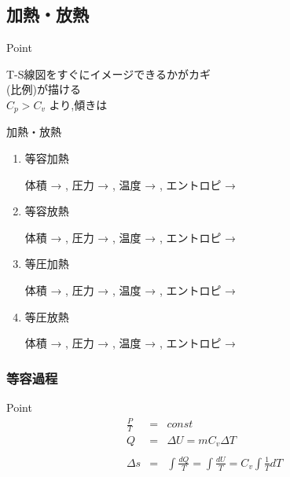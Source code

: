 \documentclass[a4paper]{jsarticle}
\begin{document}
\subsection{加熱・放熱}
\begin{itembox}[l]{Point}
    \begin{center}
        T-S線図をすぐにイメージできるかがカギ\\
        (比例)が描ける\\
        $C_p > C_v$ より,傾きは \\
    \end{center}
\end{itembox}
\begin{itembox}[l]{加熱・放熱}
    \begin{enumerate}[(1)]
        \item 等容加熱
              \begin{center}
                  体積 →  , 圧力 →  , 温度 →  , エントロピ → 
              \end{center}
        \item 等容放熱
              \begin{center}
                  体積 →  , 圧力 →  , 温度 →  , エントロピ → 
              \end{center}
        \item 等圧加熱
              \begin{center}
                  体積 →  , 圧力 →  , 温度 →  , エントロピ → 
              \end{center}
        \item 等圧放熱
              \begin{center}
                  体積 →  , 圧力 →  , 温度 →  , エントロピ → \\
              \end{center}
    \end{enumerate}
\end{itembox}
\subsubsection{等容過程}
\begin{itembox}[l]{Point}
    \begin{eqnarray*}
        \frac{P}{T}&=&const\\
        Q&=&\Delta U = mC_v\Delta T\\
        \\
        \Delta s&=&\int \frac{dQ}{T} = \int \frac{dU}{T} = C_v\int\frac{1}{T}dT\\
    \end{eqnarray*}
\end{itembox}
\end{document}
